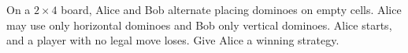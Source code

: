 On a $2\times4$ board, Alice and Bob alternate placing dominoes on empty cells. Alice may use only horizontal dominoes and Bob only vertical dominoes. Alice starts, and a player with no legal move loses. Give Alice a winning strategy.
